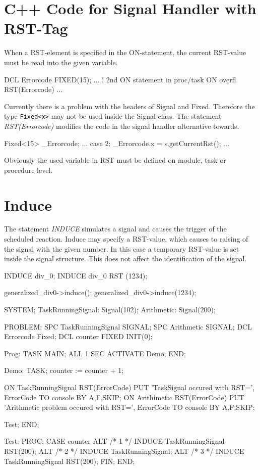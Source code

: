 \section{C++ Code for Signal Handler with RST-Tag}
When a RST-element is specified in the ON-statement, the current
RST-value must be read into the given variable.

\begin{PEARLCode}
DCL Errorcode FIXED(15);
...
   ! 2nd ON statement in proc/task
   ON overfl RST(Errorcode) ...
\end{PEARLCode}

Currently there is a problem with the headers of Signal and Fixed.
Therefore the type \verb|Fixed<x>| may not be used inside the Signal-class.
The statement {\em RST(Errorcode)} modifies the code in the signal handler
alternative towards.

\begin{CppCode}
Fixed<15> _Errorcode;
...
case 2:
   _Errorcode.x = s.getCurrentRst();
   ...
\end{CppCode}
Obviously the used variable in RST must be defined on module,
 task or procedure level. 

\section{Induce}
The statement {\em INDUCE} simulates a signal and causes the trigger 
of the scheduled reaction.
Induce may specify a RST-value, which causes to raising of the 
signal with the given number.
In this case a temporary RST-value is set inside the signal structure.
This does not affect the identification of the signal.


\begin{PEARLCode}
INDUCE div_0;
INDUCE div_0 RST (1234);
\end{PEARLCode}

\begin{CppCode}
generalized_div0->induce();
generalized_div0->induce(1234);
\end{CppCode}

\begin{PEARLCode}
SYSTEM;
   TaskRunningSignal: Signal(102);
   Arithmetic: Signal(200);

PROBLEM;
   SPC TaskRunningSignal SIGNAL;
   SPC Arithmetic SIGNAL;
   DCL Errorcode Fixed;
   DCL counter FIXED INIT(0);

Prog: TASK MAIN;
    ALL 1 SEC ACTIVATE Demo;
END;

Demo: TASK; 
   counter := counter + 1;

   ON TaskRunningSignal RST(ErrorCode)
	PUT 'TaskSignal occured with RST=', ErrorCode TO console BY A,F,SKIP;
   ON Arithimetic RST(ErrorCode)
	PUT 'Arithmetic problem occured with RST=', ErrorCode TO console BY A,F,SKIP;

   Test;
END;

Test: PROC;
   CASE counter
   ALT /* 1 */ INDUCE TaskRunningSignal RST(200);
   ALT /* 2 */ INDUCE TaskRunningSignal;
   ALT /* 3 */ INDUCE TaskRunningSignal RST(200);
   FIN;
END;
\end{PEARLCode}

